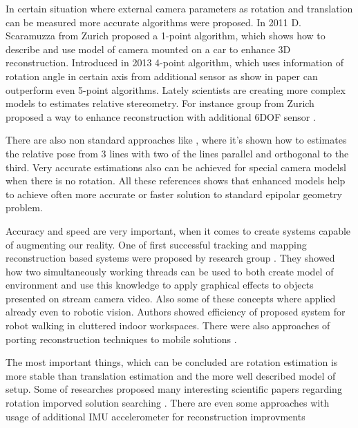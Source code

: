 In certain situation where external camera parameters as rotation and translation can be measured more accurate algorithms were proposed.  In 2011 D. Scaramuzza from Zurich proposed a 1-point algorithm\cite{1point}, which shows how to describe and use model of camera mounted on a car to enhance 3D reconstruction. Introduced in 2013  4-point algorithm, which uses information of rotation angle in certain axis from additional sensor as show in paper \cite{4point} can outperform even 5-point algorithms. Lately scientists are creating more complex models to estimates relative stereometry. For instance group from Zurich proposed a way to enhance reconstruction with additional 6DOF sensor \cite{robustCameraImu}.

There are also non standard approaches like \cite{lineBasedPose}, where it's shown how to estimates the relative pose from 3  lines with two of the lines parallel and orthogonal to the third. Very accurate estimations also can be achieved for special camera modelsl when there is no rotation\cite{pureTransl}. All these references shows that enhanced models help to achieve often  more accurate or faster solution to standard epipolar geometry problem.

Accuracy and speed are very important, when it comes to create systems capable of augmenting our reality. One of first successful tracking and mapping reconstruction based systems were proposed by research group \cite{ptam}. They showed how two simultaneously working threads can be used to both create model of environment and use this knowledge to apply graphical effects to objects presented on stream camera video. Also some of these concepts where applied already even to robotic vision. Authors showed efficiency of proposed system for robot walking in cluttered indoor workspaces\cite{monoSlam}. There were also approaches of porting reconstruction techniques to mobile solutions\cite{simultanousRecLocMap} \cite{distributedAR} \cite{combinedMonoSlam} \cite{homographyMobile}.

The most important things, which can be concluded are rotation estimation is more stable than translation estimation and the more well described model of setup. Some of researches proposed many interesting scientific papers regarding rotation imporved solution searching \cite{rotationSpaceSearch} \cite{Enqvist10stablestructure}. There are even some approaches with usage of additional IMU accelerometer for reconstruction improvments \cite{robustCameraImu}


